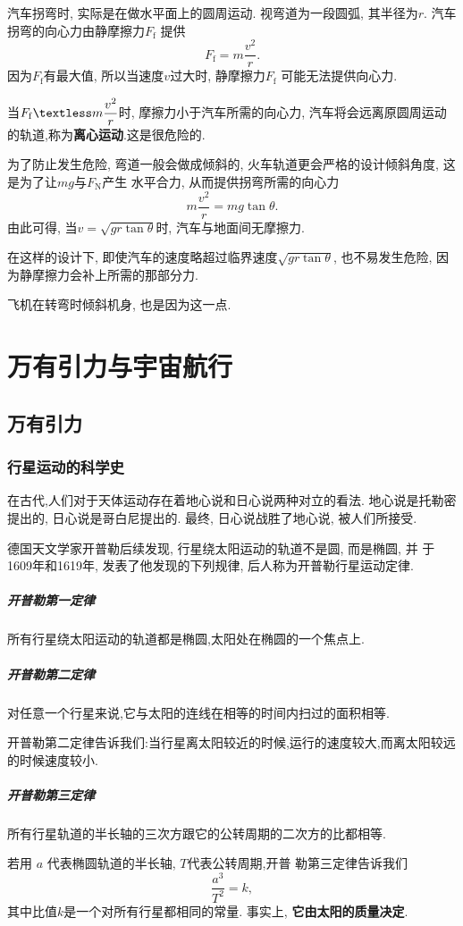 \documentclass[11pt,a4paper]{ctexart}
\begin{document}
汽车拐弯时, 实际是在做水平面上的圆周运动. 视弯道为一段圆弧, 其半径为$r$. 汽车拐弯的向心力由静摩擦力$F_\mathrm{f}$
提供$$F_\mathrm{f} = m\frac{v^2}{r}.$$因为$F_\mathrm{f}$有最大值, 所以当速度$v$过大时, 静摩擦力$F_\mathrm{f}$
可能无法提供向心力.

当$F_\mathrm{f} \textless m\displaystyle\frac{v^2}{r}$时, 摩擦力小于汽车所需的向心力,
汽车将会远离原圆周运动的轨道,称为\textbf{离心运动}.这是很危险的.

为了防止发生危险, 弯道一般会做成倾斜的, 火车轨道更会严格的设计倾斜角度, 这是为了让$mg$与$F_\mathrm{N}$产生
水平合力, 从而提供拐弯所需的向心力$$m\frac{v^2}{r} = mg\tan \theta.$$
由此可得, 当$v = \sqrt{gr\tan \theta}$时, 汽车与地面间无摩擦力.

在这样的设计下, 即使汽车的速度略超过临界速度$\sqrt{gr\tan \theta}$, 也不易发生危险, 因为静摩擦力会补上所需的那部分力.

飞机在转弯时倾斜机身, 也是因为这一点.

\section{万有引力与宇宙航行}

\subsection{万有引力}

\subsubsection{行星运动的科学史}

在古代,人们对于天体运动存在着地心说和日心说两种对立的看法. 地心说是托勒密提出的, 日心说是哥白尼提出的. 最终,
日心说战胜了地心说, 被人们所接受.

德国天文学家开普勒后续发现, 行星绕太阳运动的轨道不是圆, 而是椭圆, 并
于1609年和1619年, 发表了他发现的下列规律, 后人称为开普勒行星运动定律.

\subparagraph{开普勒第一定律}所有行星绕太阳运动的轨道都是椭圆,太阳处在椭圆的一个焦点上.

\subparagraph{开普勒第二定律} 对任意一个行星来说,它与太阳的连线在相等的时间内扫过的面积相等.

开普勒第二定律告诉我们:当行星离太阳较近的时候,运行的速度较大,而离太阳较远的时候速度较小.

\subparagraph{开普勒第三定律} 所有行星轨道的半长轴的三次方跟它的公转周期的二次方的比都相等.

若用 $a$ 代表椭圆轨道的半长轴, $T$代表公转周期,开普
勒第三定律告诉我们$$\frac{a^3}{T^2} = k, $$其中比值$k$是一个对所有行星都相同的常量.
事实上, \textbf{它由太阳的质量决定}.
\end{document}
